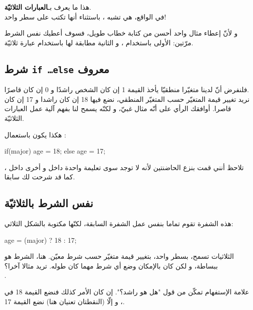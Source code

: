 هذا ما يعرف بـ\textbf{العبارات الثلاثيّة}.\\
في الواقع، هي تشبه
،
باستثناء أنها تكتب على سطر واحد!

و لأنّ إعطاء مثال واحد أحسن من كتابة خطاب طويل، فسوف أعطيك نفس الشرط مرّتين: الأولى باستخدام
،
و الثانية مطابقة لها باستخدام عبارة ثلاثيّة.
\subsection{شرط \texttt{if \dots else} معروف}

فلنفرض أنّ لدينا متغيّرا منطقيّا
يأخذ القيمة 1 إن كان الشخص راشدًا و 0 إن كان قاصرًا.\\
نريد تغيير قيمة المتغيّر 
حسب المتغيّر المنطقي، نضع فيها 18 إن كان راشدا و 17 إن كان قاصرا. أوافقك الرأي على أنّه مثال غبيّ، و لكنّه يسمح لنا بفهم آلية عمل العبارات الثلاثيّة.

هكذا يكون باستعمال :

\begin{Csource}
if(major)
	age = 18;
else
	age = 17;
\end{Csource}

\begin{information}
تلاحظ أنني قمت بنزع الحاضنتين لأنه لا توجد سوى تعليمة واحدة داخل 
و أخرى داخل 
،
كما قد شرحت لك سابقا.
\end{information}

\subsection{نفس الشرط بالثلاثيّة}

هذه الشفرة تقوم تماما بنفس عمل الشفرة السابقة، لكنّها مكتوبة بالشكل الثلاثي: 

\begin{Csource}
age = (major) ? 18 : 17;
\end{Csource}

الثلاثيات تسمح، بسطر واحد، بتغيير قيمة متغيّر حسب شرط معيّن. هنا، الشرط هو
ببساطة، و لكن كان بالإمكان وضع أي شرط مهما كان طوله. تريد مثالا آخرا؟\\ 
.

علامة الإستفهام تمكّن من قول "هل هو راشد؟". إن كان الأمر كذلك فنضع القيمة 18 في
،
و إلّا (النقطتان تعنيان
هنا) نضع القيمة 17.

